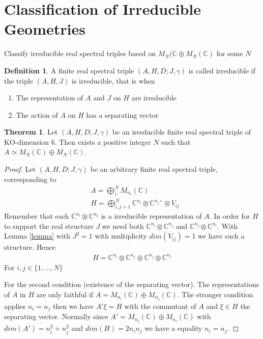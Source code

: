 \documentclass[a4paper]{article}
\theoremstyle{definition}
\newtheorem{definition}{Definition}
\theoremstyle{definition}
\theoremstyle{definition}
\theoremstyle{theorem}
\newtheorem{theorem}{Theorem}
\theoremstyle{theorem}
\theoremstyle{theorem}
\begin{document}
\section{Classification of Irreducible Geometries}
Classify irreducible real spectral triples based on $M_N(\mathbb{C} \oplus
M_N(\mathbb{C})$ for some $N$
\begin{definition}
    A finite real spectral triple $(A, H, D; J, \gamma)$ is called irreducible
    if the triple $(A, H, J)$ is irreducible, that is when
    \begin{enumerate}
        \item The representation of $A$ and $J$ on $H$ are irreducible
        \item The action of $A$ on $H$ has a separating vector
    \end{enumerate}
\end{definition}

\begin{theorem}
    Let $(A, H, D; J, \gamma)$ be an irreducible finite real spectral triple of
    KO-dimension 6. Then exists a positive integer $N$ such that $A \simeq
    M_N(\mathbb{C}) \oplus M_N(\mathbb{C})$.
\end{theorem}
\begin{proof}
    Let $(A, H, D; J, \gamma)$ be an arbitrary finite real spectral triple,
    corresponding to
    \begin{align}
        &A = \bigoplus_i^{N} M_{n_i}(\mathbb{C})\\
        &H = \bigoplus_{i,j=1}^N \mathbb{C}^{n_i} \otimes
        \mathbb{C}^{n_j\circ} \otimes V_{ij}
    \end{align}
    Remember that each $\mathbb{C}^{n_i} \otimes \mathbb{C}^{n_j}$ is a
    irreducible representation of $A$. In order for $H$ to support the real
    structure $J$ we need both $\mathbb{C}^{n_i} \otimes \mathbb{C}^{n_j}$
    and $\mathbb{C}^{n_j} \otimes \mathbb{C}^{n_i}$. With Lemma \ref{lemma}
    with $J^2 = 1$ with multiplicity $dim(V_{ij}) = 1$ we have such a
    structure. Hence
    \begin{align}
        H = \mathbb{C}^{n_i} \otimes \mathbb{C}^{n_j} \oplus \mathbb{C}^{n_j}
        \otimes \mathbb{C}^{n_i}
    \end{align}
    For $i,j \in \{1, \dots, N\}$
    \newline

    For the second condition (existence of the separating vector). The
    representations of $A$ in $H$ are only faithful if $A = M_{n_i}(\mathbb{C})
    \oplus M_{n_j}(\mathbb{C})$. The stronger condition applies $n_i = n_j$
    then we have $A' \xi = H$ with the commutant of $A$ and $\xi \in H$ the
    separating vector. Normally since $A' = M_{n_j}(\mathbb{C}) \oplus
    M_{n_i}(\mathbb{C})$ with $dim(A') = n_i^2 + n_j^2$ and $dim(H) = 2n_i n_j$
    we have a equality $n_i = n_j$.
\end{proof}
\end{document}
